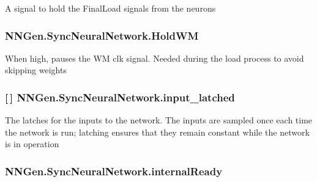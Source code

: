 A signal to hold the Final\+Load signals from the neurons 

\hypertarget{class_n_n_gen_1_1_sync_neural_network_adde5cc8cf981b7e6dd24ddcb0193cd9a}{}
\subsubsection[{Hold\+W\+M}]{ N\+N\+Gen.\+Sync\+Neural\+Network.\+Hold\+W\+M\hspace{0.3cm}{\ttfamily [get]}}\label{class_n_n_gen_1_1_sync_neural_network_adde5cc8cf981b7e6dd24ddcb0193cd9a}


When high, pauses the W\+M clk signal. Needed during the load process to avoid skipping weights 

\hypertarget{class_n_n_gen_1_1_sync_neural_network_ac94c01526c4547dd8bf1e0b18d23dde9}{}
\subsubsection[{input\+\_\+latched}]{ \mbox{[}$\,$\mbox{]} N\+N\+Gen.\+Sync\+Neural\+Network.\+input\+\_\+latched\hspace{0.3cm}{\ttfamily [get]}}\label{class_n_n_gen_1_1_sync_neural_network_ac94c01526c4547dd8bf1e0b18d23dde9}


The latches for the inputs to the network. The inputs are sampled once each time the network is run; latching ensures that they remain constant while the network is in operation 

\hypertarget{class_n_n_gen_1_1_sync_neural_network_ac2ec6cef24b9127af62c98111bc8ce95}{}
\subsubsection[{internal\+Ready}]{ N\+N\+Gen.\+Sync\+Neural\+Network.\+internal\+Ready\hspace{0.3cm}{\ttfamily [get]}}\label{class_n_n_gen_1_1_sync_neural_network_ac2ec6cef24b9127af62c98111bc8ce95}



